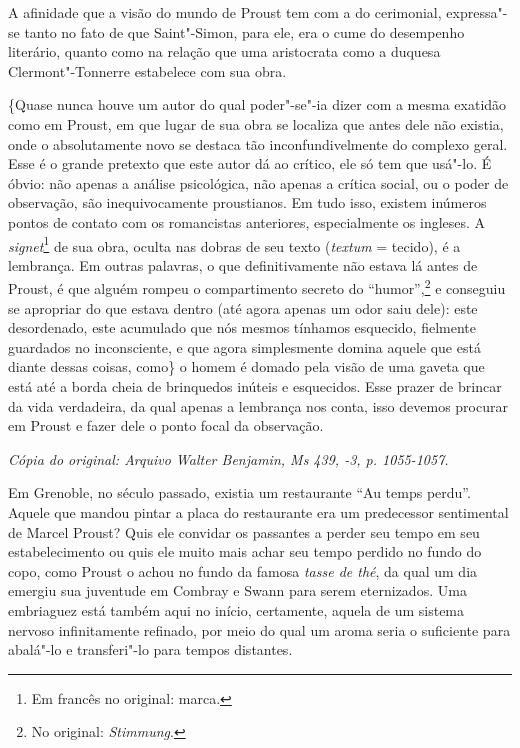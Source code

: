 A afinidade que a visão do mundo de Proust tem com a do cerimonial,
expressa"-se tanto no fato de que Saint"-Simon, para ele, era o cume do
desempenho literário, quanto como na relação que uma aristocrata como a
duquesa Clermont"-Tonnerre estabelece com sua obra.

\{Quase nunca houve um autor do qual poder"-se"-ia dizer com a mesma exatidão
como em Proust, em que lugar de sua obra se localiza que antes dele não
existia, onde o absolutamente novo se destaca tão inconfundivelmente do
complexo geral. Esse é o grande pretexto que este autor dá ao crítico,
ele só tem que usá"-lo. É óbvio: não apenas a análise psicológica, não apenas a crítica
social, ou o poder de observação, são inequivocamente proustianos. Em
tudo isso, existem inúmeros pontos de contato com os romancistas
anteriores, especialmente os ingleses. A \emph{signet}\footnote{Em francês no original: marca. \versal{[N. T.]}} de sua obra, oculta nas dobras de
seu texto (\emph{textum} = tecido), é a lembrança. Em outras palavras, o
que definitivamente não estava lá antes de Proust, é que alguém rompeu o
compartimento secreto do ``humor'',\footnote{No original:
  \emph{Stimmung}. \versal{[N. T.]}} e conseguiu se apropriar do que estava dentro (até
agora apenas um odor saiu dele): este desordenado, este acumulado que
nós mesmos tínhamos esquecido, fielmente guardados no inconsciente, e
que agora simplesmente domina aquele que está diante dessas coisas,
como\} o homem é domado pela visão de uma gaveta que está até a borda
cheia de brinquedos inúteis e esquecidos. Esse prazer de brincar da vida
verdadeira, da qual apenas a lembrança nos conta, isso devemos procurar
em Proust e fazer dele o ponto focal da observação.


\begin{flushright}
\emph{\small{Cópia do original: Arquivo Walter Benjamin, Ms 439, -3, p. 1055-1057.}}
\end{flushright}

Em Grenoble, no século passado, existia um restaurante ``Au temps
perdu''. Aquele que mandou pintar a placa do restaurante era um
predecessor sentimental de Marcel Proust? Quis ele convidar os passantes
a perder seu tempo em seu estabelecimento ou quis ele muito mais achar
seu tempo perdido no fundo do copo, como Proust o achou no fundo da
famosa \emph{tasse de thé}, da qual um dia emergiu sua juventude em
Combray e Swann para serem eternizados. Uma embriaguez está também aqui
no início, certamente, aquela de um sistema nervoso infinitamente
refinado, por meio do qual um aroma seria o suficiente para abalá"-lo e
transferi"-lo para tempos distantes.

